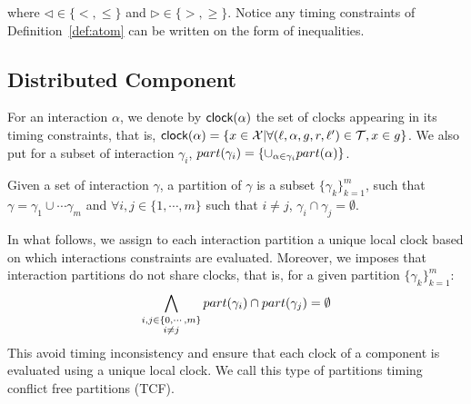 where $\triangleleft\in\{<,\le\}$ and $\triangleright\in\{>,\ge\}$.
Notice any timing constraints of Definition~\ref{def:atom} can be written on the form of inequalities. 

\subsection{Distributed Component}

For an interaction $\alpha$, we denote by $\textsf{clock}(\alpha)$ the set of clocks appearing in its
timing constraints, that is, $\textsf{clock}(\alpha)=\{x\in\mathcal{X}|\forall (\ell,\alpha,g,r,\ell')\in\mathcal{T}, x\in g \}$.
We also put for a subset of interaction $\gamma_i$, $part(\gamma_i)=\{\cup_{\alpha\in\gamma_i}part(\alpha)\}$.

\begin{definition}
  Given a set of interaction $\gamma$, a partition of $\gamma$ is a subset $\{\gamma_k\}_{k=1}^m$, such that
  $\gamma=\gamma_1\cup\cdots\gamma_m$ and $\forall i,j\in\{1,\cdots,m\}$ such that $i\neq j$, $\gamma_i\cap\gamma_j=\emptyset$.
\end{definition}

In what follows, we assign to each interaction partition a unique local clock based on which
interactions constraints are evaluated. Moreover, we imposes that interaction partitions do not share clocks,
that is, for a given partition $\{\gamma_k\}_{k=1}^m$:
\begin{displaymath}
  \bigwedge_{\substack{i,j\in\{0,\cdots,m\}\\i\neq j}}part(\gamma_i)\cap part(\gamma_j)=\emptyset
\end{displaymath}
This avoid timing inconsistency and ensure that each clock of a 
component is evaluated using a unique local clock. We call this type of partitions
timing conflict free partitions (TCF).



